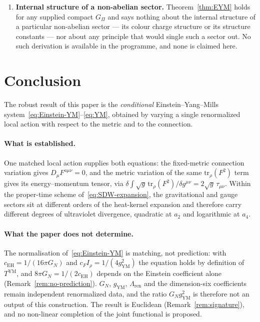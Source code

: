 \documentclass[12pt,a4paper]{article}
\theoremstyle{remark}
\begin{document}
\begin{enumerate}
        \item \textbf{Internal structure of a non-abelian sector.}
        Theorem~\ref{thm:EYM} holds for any supplied compact $G_\Pi$ and says nothing about the
        internal structure of a particular non-abelian sector --- its colour charge structure or
        its structure constants --- nor about any principle that would single such a sector out.
        No such derivation is available in the programme, and none is claimed here.
      \end{enumerate}

      \clearpage
  \section{Conclusion}
    \label{sec:conclusion}

    The robust result of this paper is the \emph{conditional} Einstein--Yang--Mills
    system~\eqref{eq:Einstein-YM}--\eqref{eq:YM}, obtained by varying a single renormalized local
    action with respect to the metric and to the connection.

    \paragraph{What is established.}
      One matched local action supplies both equations: the fixed-metric connection variation
      gives $D_\mu F^{a\mu\nu} = 0$, and the metric variation of the same
      $\mathrm{tr}_\rho(F^2)$ term gives its energy--momentum tensor, via
      $\delta\!\int\!\sqrt{g}\,\mathrm{tr}_\rho(F^2)/\delta g^{\mu\nu} = 2\sqrt{g}\,\tau_{\mu\nu}$.
      Within the proper-time scheme of~\eqref{eq:SDW-expansion}, the gravitational and gauge
      sectors sit at different orders of the heat-kernel expansion and therefore carry different
      degrees of ultraviolet divergence, quadratic at $a_2$ and logarithmic at $a_4$.

    \paragraph{What the paper does not determine.}
      The normalisation of~\eqref{eq:Einstein-YM} is matching, not prediction: with
      $c_{\mathrm{EH}} = 1/(16\pi G_N)$ and $c_F I_\rho = 1/(4g_{\mathrm{YM}}^2)$ the equation
      holds by definition of $T^{\mathrm{YM}}$, and $8\pi G_N = 1/(2c_{\mathrm{EH}})$ depends on
      the Einstein coefficient alone (Remark~\ref{rem:no-prediction}).
      $G_N$, $g_{\mathrm{YM}}$, $\Lambda_{\mathrm{ren}}$ and the dimension-six coefficients remain
      independent renormalized data, and the ratio $G_N g_{\mathrm{YM}}^2$ is therefore not an
      output of this construction.
      The result is Euclidean (Remark~\ref{rem:signature}), and no non-linear completion of the
      joint functional is proposed.
\end{document}
